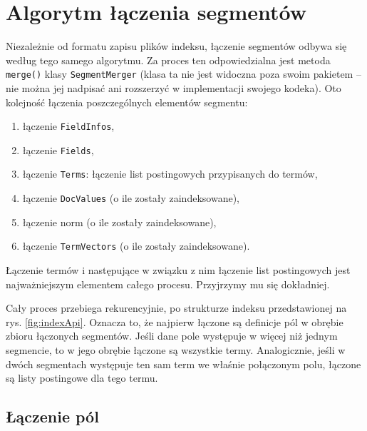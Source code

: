 \chapter{Algorytm łączenia segmentów}

Niezależnie od formatu zapisu plików indeksu, łączenie segmentów odbywa się według tego samego algorytmu. Za proces ten odpowiedzialna jest metoda \texttt{merge()} klasy \texttt{SegmentMerger} (klasa ta nie jest widoczna poza swoim pakietem -- nie można jej nadpisać ani rozszerzyć w implementacji swojego kodeka). Oto kolejność łączenia poszczególnych elementów segmentu:
\begin{enumerate}
 \item łączenie \texttt{FieldInfos},
 \item łączenie \texttt{Fields},
 \item łączenie \texttt{Terms}: łączenie list postingowych przypisanych do termów,
 \item łączenie \texttt{DocValues} (o ile zostały zaindeksowane),
 \item łączenie norm (o ile zostały zaindeksowane),
 \item łączenie \texttt{TermVectors} (o ile zostały zaindeksowane).
\end{enumerate}

%
Łączenie termów i następujące w związku z nim łączenie list postingowych jest najważniejszym elementem całego procesu. Przyjrzymy mu się dokładniej.

Cały proces przebiega rekurencyjnie, po strukturze indeksu przedstawionej na rys. \ref{fig:indexApi}. Oznacza to, że najpierw łączone są definicje pól w obrębie zbioru łączonych segmentów. Jeśli dane pole występuje w więcej niż jednym segmencie, to w jego obrębie łączone są wszystkie termy. Analogicznie, jeśli w dwóch segmentach występuje ten sam term we właśnie połączonym polu, łączone są listy postingowe dla tego termu.

\section{Łączenie pól}

